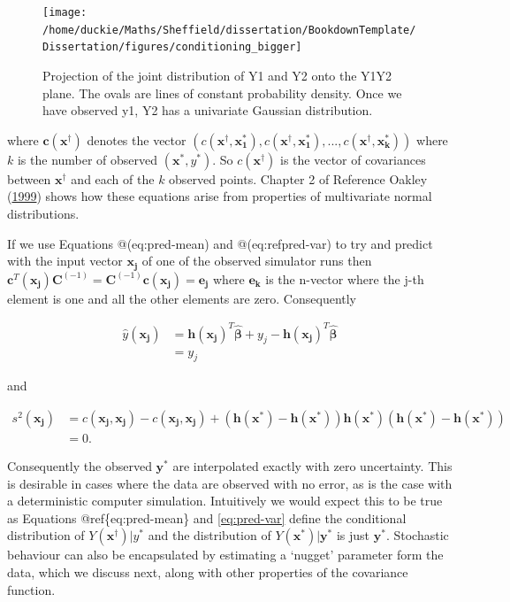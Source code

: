 \documentclass[
  12pt,
  a4paper,
  twoside]{book}
\begin{document}
\begin{figure}[H]

{\centering \texttt{[image: /home/duckie/Maths/Sheffield/dissertation/BookdownTemplate/Dissertation/figures/conditioning\_bigger]} 

}

\caption{Projection of the joint distribution of Y1 and Y2 onto the Y1Y2 plane. The ovals are lines of constant probability density. Once we have observed y1, Y2 has a univariate Gaussian distribution.}\label{fig:conditioning}
\end{figure}

where \(\mathbf{c}(\mathbf{x^\dagger})\) denotes the vector \(\left( c(\mathbf{x^\dagger}, \mathbf{x_1^*}),c(\mathbf{x^\dagger}, \mathbf{x_1^*}),...,c(\mathbf{x^\dagger}, \mathbf{x_k^*}) \right)\) where \(k\) is the number of observed \((\mathbf{x^*}, y^*)\). So \(c(\mathbf{x^\dagger})\) is the vector of covariances between \(\mathbf{x^\dagger}\) and each of the \(k\) observed points. Chapter 2 of Reference Oakley (\protect\hyperlink{ref-jeothesis}{1999}) shows how these equations arise from properties of multivariate normal distributions.

If we use Equations @(eq:pred-mean) and @(eq:refpred-var) to try and predict with the input vector \(\mathbf{x_j}\) of one of the observed simulator runs then \(\mathbf{c}^T(\mathbf{x_j}) \mathbf{C}^{(-1)} = \mathbf{C}^{(-1)} \mathbf{c}(\mathbf{x_j}) = \mathbf{e_j}\) where \(\mathbf{e_k}\) is the n-vector where the j-th element is one and all the other elements are zero. Consequently

\begin{align}
\label{eq:pred-design-1}
\hat{y}(\mathbf{x_j}) &= \mathbf{h}(\mathbf{x_j})^T \hat{\mathbf{\beta}} + y_j - \mathbf{h}(\mathbf{x_j})^T \hat{\mathbf{\beta}} \\ \nonumber
&= y_j
\end{align}

and

\begin{align}
\label{eq:pred-design-2}
s^2(\mathbf{x_j}) &= c(\mathbf{x_j}, \mathbf{x_j}) - c(\mathbf{x_j}, \mathbf{x_j}) + \left( \mathbf{h}(\mathbf{x^*}) - \mathbf{h}(\mathbf{x^*}) \right)\mathbf{h}(\mathbf{x^*})\left( \mathbf{h}(\mathbf{x^*}) - \mathbf{h}(\mathbf{x^*}) \right)\\ \nonumber
&= 0.
\end{align}

Consequently the observed \(\mathbf{y^*}\) are interpolated exactly with zero uncertainty. This is desirable in cases where the data are observed with no error, as is the case with a deterministic computer simulation. Intuitively we would expect this to be true as Equations @ref\{eq:pred-mean\} and \eqref{eq:pred-var} define the conditional distribution of \(Y(\mathbf{x}^\dagger)|y^*\) and the distribution of \(Y(\mathbf{x^*})|\mathbf{y^*}\) is just \(\mathbf{y^*}\). Stochastic behaviour can also be encapsulated by estimating a `nugget' parameter form the data, which we discuss next, along with other properties of the covariance function.
\end{document}
